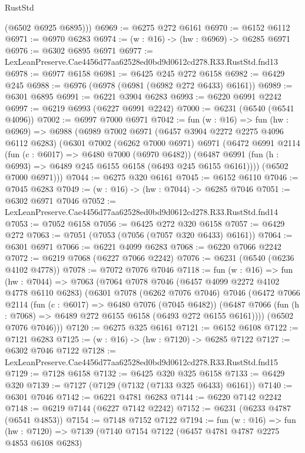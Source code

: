 \begin{lexlean}{RustStd}
\begin{coremodule}
        (@6502 @6925 @6895)))
@6969 := @6275 @272 @6161
@6970 := @6152 @6112
@6971 := @6970 @6283
@6974 := (w : @16) -> (hw : @6969) -> @6285 @6971
@6976 := @6302 @6895 @6971
@6977 := LexLeanPreserve.Cae4456d77aa62528ed0bd9d0612cd278.R33.RustStd.fnd13
@6978 := @6977 @6158
@6981 := @6425 @245 @272 @6158
@6982 := @6429 @245
@6988 := @6976 (@6978 (@6981 (@6982 @272 @6433) @6161))
@6989 := @6301 @6895
@6991 := @6221 @3904 @6283
@6993 := @6220 @6991 @2242
@6997 := @6219 @6993 (@6227 @6991 @2242)
@7000 := @6231 (@6540 (@6541 @4096))
@7002 := @6997 @7000 @6971
@7042 := fun (w : @16) =>
  fun (hw : @6969) =>
  @6988
    (@6989
      @7002
      @6971
      (@6457 @3904 @2272 @2275 @4096 @6112 @6283)
      (@6301
        @7002
        (@6262 @7000 @6971)
        @6971
        (@6472
          @6991
          @2114
          (fun (c : @6017) => @6480 @7000 (@6970 @6482))
          (@6487 @6991 (fun (h : @6993) => @6489 @245 @6155 @6158 (@6493 @245 @6155 @6161))))
        (@6502 @7000 @6971)))
@7044 := @6275 @320 @6161
@7045 := @6152 @6110
@7046 := @7045 @6283
@7049 := (w : @16) -> (hw : @7044) -> @6285 @7046
@7051 := @6302 @6971 @7046
@7052 := LexLeanPreserve.Cae4456d77aa62528ed0bd9d0612cd278.R33.RustStd.fnd14
@7053 := @7052 @6158
@7056 := @6425 @272 @320 @6158
@7057 := @6429 @272
@7063 := @7051 (@7053 (@7056 (@7057 @320 @6433) @6161))
@7064 := @6301 @6971
@7066 := @6221 @4099 @6283
@7068 := @6220 @7066 @2242
@7072 := @6219 @7068 (@6227 @7066 @2242)
@7076 := @6231 (@6540 (@6236 @4102 @4778))
@7078 := @7072 @7076 @7046
@7118 := fun (w : @16) =>
  fun (hw : @7044) =>
  @7063
    (@7064
      @7078
      @7046
      (@6457 @4099 @2272 @4102 @4778 @6110 @6283)
      (@6301
        @7078
        (@6262 @7076 @7046)
        @7046
        (@6472
          @7066
          @2114
          (fun (c : @6017) => @6480 @7076 (@7045 @6482))
          (@6487 @7066 (fun (h : @7068) => @6489 @272 @6155 @6158 (@6493 @272 @6155 @6161))))
        (@6502 @7076 @7046)))
@7120 := @6275 @325 @6161
@7121 := @6152 @6108
@7122 := @7121 @6283
@7125 := (w : @16) -> (hw : @7120) -> @6285 @7122
@7127 := @6302 @7046 @7122
@7128 := LexLeanPreserve.Cae4456d77aa62528ed0bd9d0612cd278.R33.RustStd.fnd15
@7129 := @7128 @6158
@7132 := @6425 @320 @325 @6158
@7133 := @6429 @320
@7139 := @7127 (@7129 (@7132 (@7133 @325 @6433) @6161))
@7140 := @6301 @7046
@7142 := @6221 @4781 @6283
@7144 := @6220 @7142 @2242
@7148 := @6219 @7144 (@6227 @7142 @2242)
@7152 := @6231 (@6233 @4787 (@6541 @4853))
@7154 := @7148 @7152 @7122
@7194 := fun (w : @16) =>
  fun (hw : @7120) =>
  @7139
    (@7140
      @7154
      @7122
      (@6457 @4781 @4787 @2275 @4853 @6108 @6283)

\end{coremodule}
\end{lexlean}
